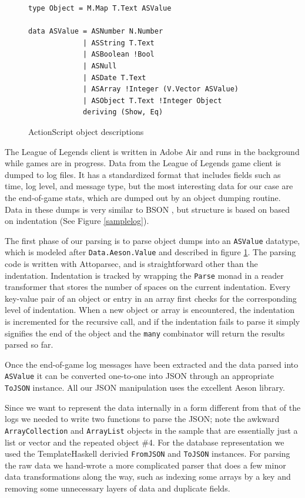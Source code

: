 \documentclass[letterpaper,twocolumn,9pt]{article}
\newcommand{\code}[1]{\texttt{#1}}
\begin{document}
\begin{figure}[h]
\footnotesize{
\begin{verbatim}
type Object = M.Map T.Text ASValue

data ASValue = ASNumber N.Number
             | ASString T.Text
             | ASBoolean !Bool
             | ASNull
             | ASDate T.Text
             | ASArray !Integer (V.Vector ASValue)
             | ASObject T.Text !Integer Object
             deriving (Show, Eq)
\end{verbatim}
}
    \caption{ActionScript object descriptions}
    \label{asvalue}
\end{figure}

The League of Legends client is written in Adobe Air and runs in the background while games are in progress. Data from the League of Legends game client is dumped to log files.  It has a standardized format that includes fields such as time, log level, and message type, but the most interesting data for our case are the end-of-game stats, which are dumped out by an object dumping routine.  Data in these dumps is very similar to BSON , but structure is based on based on indentation (See Figure \ref{samplelog}).

The first phase of our parsing is to parse object dumps into an \code{ASValue} datatype, which is modeled after \code{Data.Aeson.Value} and described in figure \ref{asvalue}.  The parsing code is written with Attoparsec, and is straightforward other than the indentation.  Indentation is tracked by wrapping the \code{Parse} monad in a reader transformer that stores the number of spaces on the current indentation.  Every key-value pair of an object or entry in an array first checks for the corresponding level of indentation.  When a new object or array is encountered, the indentation is incremented for the recursive call, and if the indentation fails to parse it simply signifies the end of the object and the \code{many} combinator will return the results parsed so far.

Once the end-of-game log messages have been extracted and the data parsed into \code{ASValue} it can be converted one-to-one into JSON through an appropriate \code{ToJSON} instance.  All our JSON manipulation uses the excellent Aeson library.

Since we want to represent the data internally in a form different from that of the logs we needed to write two functions to parse the JSON; note the awkward \code{ArrayCollection} and \code{ArrayList} objects in the sample that are essentially just a list or vector and the repeated object \#4.  For the database representation we used the TemplateHaskell derivied \code{FromJSON} and \code{ToJSON} instances.  For parsing the raw data we hand-wrote a more complicated parser that does a few minor data transformations along the way, such as indexing some arrays by a key and removing some unnecessary layers of data and duplicate fields.
\end{document}
